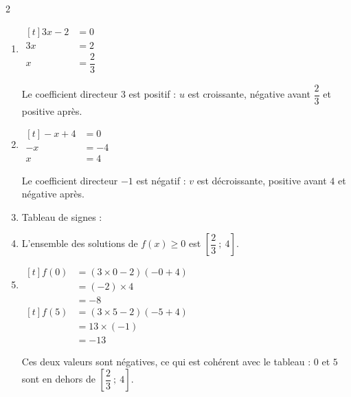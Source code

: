 \documentclass[10pt,a4paper]{article}
\begin{document}
\begin{corr}[Guidé]{2}
\begin{enumerate}[leftmargin=*]
    \item \(\begin{aligned}[t] 3x-2&=0\\ 3x&=2\\ x&=\dfrac{2}{3}\end{aligned}\)

    Le coefficient directeur \(3\) est positif : \(u\) est croissante, négative avant \(\dfrac{2}{3}\) et positive après.
    \item \(\begin{aligned}[t] -x+4&=0\\ -x&=-4\\ x&=4\end{aligned}\)

    Le coefficient directeur \(-1\) est négatif : \(v\) est décroissante, positive avant \(4\) et négative après.
    \item Tableau de signes :
    \begin{center}
    \end{center}
    \item L'ensemble des solutions de \(f(x)\geq 0\) est \(\left[\dfrac{2}{3}\ ;\ 4\right]\).
    \item \(\begin{aligned}[t] f(0)&=(3\times 0-2)(-0+4)\\ &=(-2)\times 4\\ &=-8\end{aligned}\) \qquad \(\begin{aligned}[t] f(5)&=(3\times 5-2)(-5+4)\\ &=13\times(-1)\\ &=-13\end{aligned}\)

    Ces deux valeurs sont négatives, ce qui est cohérent avec le tableau : \(0\) et \(5\) sont en dehors de \(\left[\dfrac{2}{3}\ ;\ 4\right]\).
\end{enumerate}
\end{corr}
\end{document}
